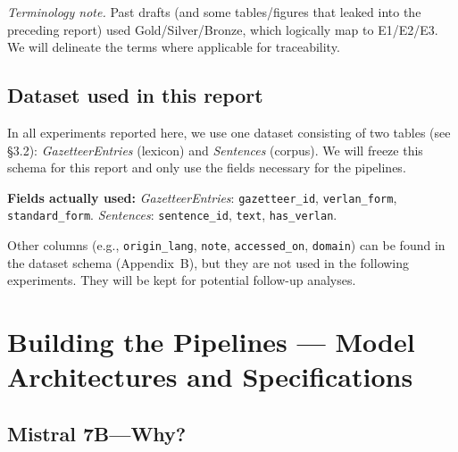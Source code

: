 \documentclass[12pt]{article}
\begin{document}
\noindent \textit{Terminology note.} Past drafts (and some tables/figures that leaked into the preceding report) used Gold/Silver/Bronze, which logically map to E1/E2/E3. We will delineate the terms where applicable for traceability.



\subsection{Dataset used in this report}

In all experiments reported here, we use one dataset consisting of two tables (see §3.2): \textit{GazetteerEntries} (lexicon) and \textit{Sentences} (corpus). We will freeze this schema for this report and only use the fields necessary for the pipelines.

\vspace{0.5em}

\textbf{Fields actually used:} \textit{GazetteerEntries}: \texttt{gazetteer\_id}, \texttt{verlan\_form}, \texttt{standard\_form}. \; \textit{Sentences}: \texttt{sentence\_id}, \texttt{text}, \texttt{has\_verlan}.

Other columns (e.g., \texttt{origin\_lang}, \texttt{note}, \texttt{accessed\_on}, \texttt{domain}) can be found in the dataset schema (Appendix~B), but they are not used in the following experiments. They will be kept for potential follow-up analyses.




\section{Building the Pipelines --- Model Architectures and Specifications}
\subsection{Mistral 7B\;---\;Why?}
\end{document}
